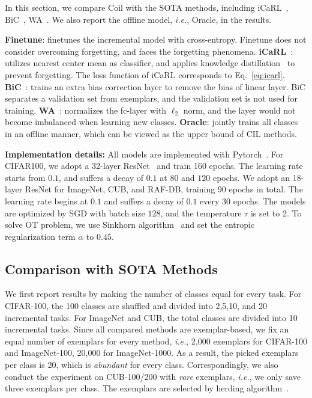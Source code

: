 \documentclass[sigconf]{acmart}
\newcommand{\ie}{\emph{i.e.}}
\newcommand{\bfname}[1]{{\bf #1}}
\newcommand{\name}{{\sc Coil }}
\begin{document}
 In this section, we compare \name with the SOTA methods, including iCaRL~\cite{rebuffi2017icarl}, BiC~\cite{wu2019large}, WA~\cite{zhao2020maintaining}.  We also report the offline model, \ie, Oracle, in the results.  

{ \bfname{Finetune}}: finetunes the incremental model with cross-entropy. Finetune does not consider overcoming forgetting, and faces the forgetting phenomena.
\bfname{iCaRL}~\cite{rebuffi2017icarl}: utilizes nearest center mean as classifier, and applies knowledge distillation~\cite{hinton2015distilling} to prevent forgetting. The loss function of iCaRL corresponds to Eq.~\ref{eq:icarl}.
{\bfname{BiC}~\cite{wu2019large}}: trains an extra bias correction layer to remove the bias of linear layer. BiC separates a validation set from exemplars, and the validation set is not used for training.
{\bfname{WA}~\cite{zhao2020maintaining}}: normalizes the fc-layer with ${\ell}_2$ norm, and the layer would not become imbalanced when learning new classes. 
{\bfname{Oracle}}: jointly trains all classes in an offline manner, which can be viewed as the upper bound of CIL methods.


{\noindent \bf Implementation details:} All models are implemented with Pytorch~\cite{paszke2019pytorch}. For CIFAR100, we adopt a 32-layer ResNet~\cite{he2015residual} and train 160 epochs. The learning rate starts from $0.1$, and suffers a decay of $0.1$ at $80$ and $120$ epochs. We adopt an 18-layer ResNet  for ImageNet, CUB, and RAF-DB, training 90 epochs in total. The learning rate begins at $0.1$ and suffers a decay of $0.1$ every $30$ epochs. The models are optimized by SGD with batch size $128$, and the temperature $\tau$ is set to 2. To solve OT problem, we use Sinkhorn algorithm~\cite{cuturi2013sinkhorn,sinkhorn1967concerning} and set the entropic regularization term $\alpha$ to $0.45$.



\subsection{Comparison with SOTA Methods}

We first report results by making the number of classes equal for every task. For CIFAR-100, the 100 classes are shuffled and divided into 2,5,10, and 20  incremental tasks. For ImageNet and CUB, the total classes are divided into 10 incremental tasks. Since all compared methods are exemplar-based, we fix an equal number of exemplars for every method, \ie, 2,000 exemplars for CIFAR-100 and ImageNet-100, 20,000 for ImageNet-1000. As a result, the picked exemplars per class is 20, which is \emph{abundant} for every class.
Correspondingly, we also conduct the experiment on CUB-100/200 with \emph{rare} exemplars, \ie, we only save three exemplars per class. The exemplars are selected by herding algorithm~\cite{welling2009herding}.
\end{document}
